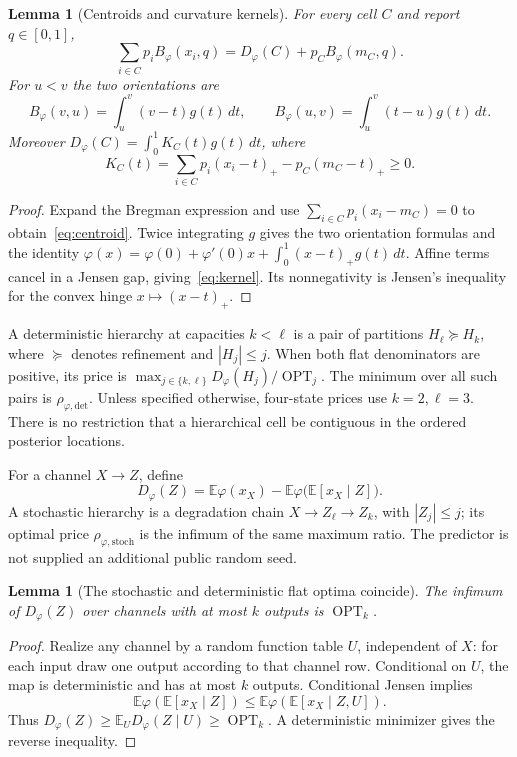 \documentclass[11pt]{article}
\newtheorem{lemma}[theorem]{Lemma}
\theoremstyle{definition}\newtheorem{definition}[theorem]{Definition}
\theoremstyle{remark}\newtheorem{remark}[theorem]{Remark}
\newcommand{\OPT}{\operatorname{OPT}}
\newcommand{\E}{\mathbb E}
\newcommand{\detp}{\mathrm{det}}
\newcommand{\stp}{\mathrm{stoch}}
\begin{document}
\begin{lemma}[Centroids and curvature kernels]
\label{lem:identities}
For every cell $C$ and report $q\in[0,1]$,
\begin{equation}
 \sum_{i\in C}p_iB_\varphi(x_i,q)
 =D_\varphi(C)+p_CB_\varphi(m_C,q).
 \label{eq:centroid}
\end{equation}
For $u<v$ the two orientations are
\[
 B_\varphi(v,u)=\int_u^v(v-t)g(t)\,dt,
 \qquad B_\varphi(u,v)=\int_u^v(t-u)g(t)\,dt.
\]
Moreover $D_\varphi(C)=\int_0^1 K_C(t)g(t)\,dt$, where
\begin{equation}
 K_C(t)=\sum_{i\in C}p_i(x_i-t)_+-p_C(m_C-t)_+\ge0.
 \label{eq:kernel}
\end{equation}
\end{lemma}
\begin{proof}
Expand the Bregman expression and use
$\sum_{i\in C}p_i(x_i-m_C)=0$ to obtain~\eqref{eq:centroid}.
Twice integrating $g$ gives the two orientation formulas and the identity
$\varphi(x)=\varphi(0)+\varphi'(0)x+
\int_0^1(x-t)_+g(t)\,dt$. Affine terms cancel in a Jensen gap,
giving~\eqref{eq:kernel}. Its nonnegativity is Jensen's inequality for
the convex hinge $x\mapsto(x-t)_+$.
\end{proof}

A deterministic hierarchy at capacities $k<\ell$ is a pair of partitions
$H_\ell\succeq H_k$, where $\succeq$ denotes refinement and
$|H_j|\le j$. When both flat denominators are positive, its price is
$\max_{j\in\{k,\ell\}}D_\varphi(H_j)/\OPT_j$.
The minimum over all such pairs is $\rho_{\varphi,\detp}$.
Unless specified otherwise, four-state prices use $k=2,\ell=3$.
There is no restriction that a hierarchical cell be contiguous in the
ordered posterior locations.

For a channel $X\to Z$, define
\[
 D_\varphi(Z)=\E\varphi(x_X)-
                \E\varphi\bigl(\E[x_X\mid Z]\bigr).
\]
A stochastic hierarchy is a degradation chain
$X\to Z_\ell\to Z_k$, with $|Z_j|\le j$; its optimal price
$\rho_{\varphi,\stp}$ is the infimum of the same maximum ratio.
The predictor is not supplied an additional public random seed.

\begin{lemma}[The stochastic and deterministic flat optima coincide]
\label{lem:flat}
The infimum of $D_\varphi(Z)$ over channels with at most $k$ outputs is
$\OPT_k$.
\end{lemma}
\begin{proof}
Realize any channel by a random function table $U$, independent of $X$:
for each input draw one output according to that channel row. Conditional
on $U$, the map is deterministic and has at most $k$ outputs. Conditional
Jensen implies
\[
 \E\varphi(\E[x_X\mid Z])\le
 \E\varphi(\E[x_X\mid Z,U]).
\]
Thus $D_\varphi(Z)\ge\E_U D_\varphi(Z\mid U)\ge\OPT_k$.
A deterministic minimizer gives the reverse inequality.
\end{proof}
\end{document}
